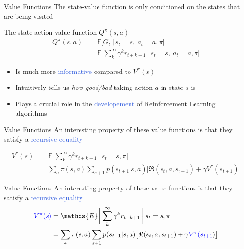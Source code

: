 \documentclass{beamer}
\begin{document}
\begin{frame}{Value Functions}
	The state-value function is only conditioned on the states that are being visited
	
	\begin{block}{The state-action value function $Q^{\pi}(s,a)$}
		\begin{align*}
		Q^{\pi}(s,a) & = \mathds{E} \bigg[G_t \: \big| \: s_t=s, \: a_t=a,  \pi \bigg] \\ 
			& = \mathds{E} \bigg[\sum_{k}^{\infty}\gamma^{k} r_{t+k+1} \: \bigg| \: s_t=s, \: a_t=a, \pi \bigg]
		\end{align*}
	\end{block}

	\begin{itemize}
		\item Is much more \textcolor{RoyalBlue}{informative} compared to $V^{\pi}(s)$
		\item Intuitively tells us \textit{how good/bad} taking action $a$ in state $s$ is
		\item Plays a crucial role in the \textcolor{RoyalBlue}{developement} of Reinforcement Learning algorithms
	\end{itemize}

\end{frame}

\begin{frame}{Value Functions}
	An interesting property of these value functions is that they satisfy a \textcolor{RoyalBlue}{recursive equality}

		\begin{align*}
			V^{\pi}(s) & = \mathds{E} \bigg[\sum_{k}^{\infty}\gamma^{k} r_{t+k+1} \: \bigg| \: s_t=s,\pi \bigg] \\
			   & = \sum_a \pi(s,a) \sum_{s+1} p(s_{t+1}|s,a)\big[\Re(s_t, a, s_{t+1}) + \gamma V^{\pi}(s_{t+1}) \big] 
		\end{align*}
\end{frame}


\begin{frame}{Value Functions}
	An interesting property of these value functions is that they satisfy a \textcolor{RoyalBlue}{recursive equality}
		\begin{align*}
			\textcolor{blue}{V^{\pi}(s)} & = \mathds{E} \bigg[\sum_{k}^{\infty}\gamma^{k} r_{t+k+1} \: \bigg| \: s_t=s,\pi \bigg] \\
			   & = \sum_a \pi(s,a) \sum_{s+1} p(s_{t+1}|s,a)\big[\Re(s_t, a, s_{t+1}) + \gamma \textcolor{blue}{V^{\pi}(s_{t+1}}) \big] 
		\end{align*}
\end{frame}
\end{document}
